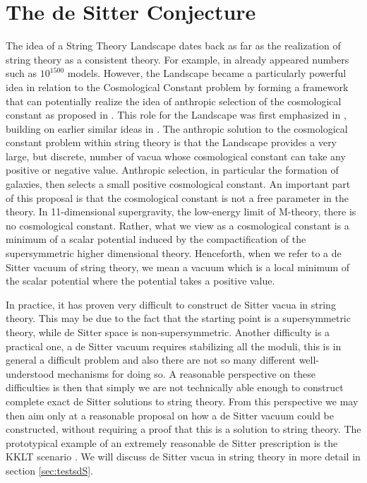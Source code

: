 \documentclass[11pt,a4paper]{article}
\numberwithin{equation}{section}
\numberwithin{table}{section}\setlength{\multlinegap}{25pt}
\begin{document}
{%
\section{The de Sitter Conjecture}
\label{sec:dsconj}

The idea of a String Theory Landscape dates back as far as the realization of string theory as a consistent theory. For example, in \cite{Lerche:173303} already appeared numbers such as $10^{1500}$ models. However, the Landscape became a particularly powerful idea in relation to the Cosmological Constant problem by forming a framework that can potentially realize the idea of anthropic selection of the cosmological constant as proposed in \cite{PhysRevLett.59.2607}. This role for the Landscape was first emphasized in \cite{Bousso:2000xa}, building on earlier similar ideas in \cite{Brown:1987dd,Brown:1988kg,Banks:1984cw}. The anthropic solution to the cosmological constant problem within string theory is that the Landscape provides a very large, but discrete, number of vacua whose cosmological constant can take any positive or negative value. Anthropic selection, in particular the formation of galaxies, then selects a small positive cosmological constant. An important part of this proposal is that the cosmological constant is not a free parameter in the theory. In 11-dimensional supergravity, the low-energy limit of M-theory, there is no cosmological constant. Rather, what we view as a cosmological constant is a minimum of a scalar potential induced by the compactification of the supersymmetric higher dimensional theory. Henceforth, when we refer to a de Sitter vacuum of string theory, we mean a vacuum which is a local minimum of the scalar potential where the potential takes a positive value. 

In practice, it has proven very difficult to construct de Sitter vacua in string theory. This may be due to the fact that the starting point is a supersymmetric theory, while de Sitter space is non-supersymmetric. Another difficulty is a practical one, a de Sitter vacuum requires stabilizing all the moduli, this is in general a difficult problem and also there are not so many different well-understood mechanisms for doing so. A reasonable perspective on these difficulties is then that simply we are not technically able enough to construct complete exact de Sitter solutions to string theory. From this perspective we may then aim only at a reasonable proposal on how a de Sitter vacuum could be constructed, without requiring a proof that this is a solution to string theory. The prototypical example of an extremely reasonable de Sitter prescription is the KKLT scenario \cite{Kachru:2003aw}. We will discuss de Sitter vacua in string theory in more detail in section \ref{sec:testsdS}. 

}
\end{document}
